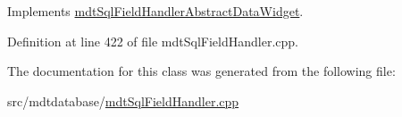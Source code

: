 Implements \hyperlink{classmdt_sql_field_handler_abstract_data_widget_a460c76d650eba635ffb42951c7adbb50}{mdt\-Sql\-Field\-Handler\-Abstract\-Data\-Widget}.



Definition at line 422 of file mdt\-Sql\-Field\-Handler.\-cpp.



The documentation for this class was generated from the following file\-:\begin{DoxyCompactItemize}
\item 
src/mdtdatabase/\hyperlink{mdt_sql_field_handler_8cpp}{mdt\-Sql\-Field\-Handler.\-cpp}\end{DoxyCompactItemize}
